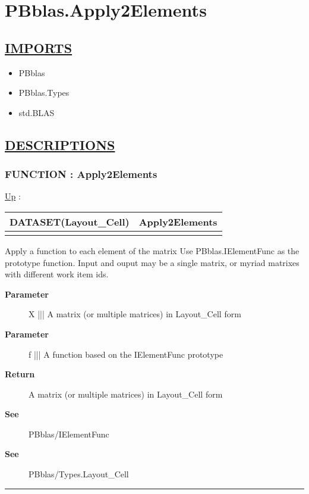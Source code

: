 \chapter*{PBblas.Apply2Elements}
\hypertarget{ecldoc:toc:PBblas.Apply2Elements}{}

\section*{\underline{IMPORTS}}
\begin{itemize}
\item PBblas
\item PBblas.Types
\item std.BLAS
\end{itemize}

\section*{\underline{DESCRIPTIONS}}
\subsection*{FUNCTION : Apply2Elements}
\hypertarget{ecldoc:pbblas.apply2elements}{}
\hyperlink{ecldoc:toc:PBblas}{Up} :

{\renewcommand{\arraystretch}{1.5}
\begin{tabularx}{\textwidth}{|>{\raggedright\arraybackslash}l|X|}
\hline
\hspace{0pt}DATASET(Layout\_Cell) & Apply2Elements \\
\hline
\multicolumn{2}{|>{\raggedright\arraybackslash}X|}{\hspace{0pt}(DATASET(Layout\_Cell) X, IElementFunc f)} \\
\hline
\end{tabularx}
}

\par
Apply a function to each element of the matrix Use PBblas.IElementFunc as the prototype function. Input and ouput may be a single matrix, or myriad matrixes with different work item ids.

\par
\begin{description}
\item [\textbf{Parameter}] X ||| A matrix (or multiple matrices) in Layout\_Cell form
\item [\textbf{Parameter}] f ||| A function based on the IElementFunc prototype
\item [\textbf{Return}] A matrix (or multiple matrices) in Layout\_Cell form
\item [\textbf{See}] PBblas/IElementFunc
\item [\textbf{See}] PBblas/Types.Layout\_Cell
\end{description}

\rule{\linewidth}{0.5pt}
